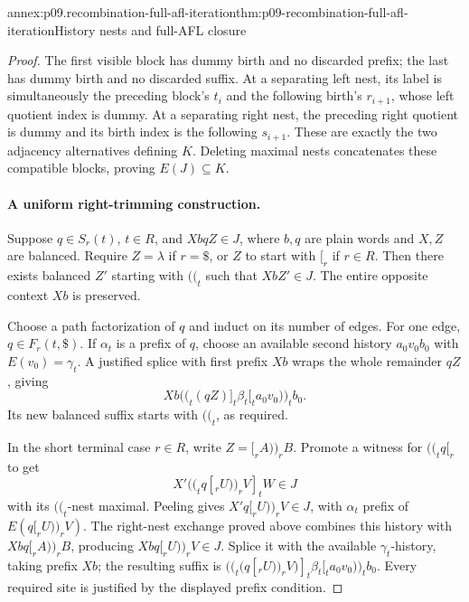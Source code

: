 \begin{annexitem}{annex:p09.recombination-full-afl-iteration}{thm:p09-recombination-full-afl-iteration}{History nests and full-AFL closure}
\begin{proof}
The first visible block has dummy birth and no discarded prefix;
the last has dummy birth and no discarded suffix.
At a separating left nest, its label is simultaneously the preceding
block's \(t_i\) and the following birth's \(r_{i+1}\), whose left
quotient index is dummy. At a separating right nest, the preceding
right quotient is dummy and its birth index is the following \(s_{i+1}\).
These are exactly the two adjacency alternatives defining \(K\).
Deleting maximal nests concatenates these compatible blocks, proving
\(E(J)\subseteq K\).

\paragraph{A uniform right-trimming construction.}
Suppose \(q\in S_r(t)\), \(t\in R\), and
\(XbqZ\in J\), where \(b,q\) are plain words and \(X,Z\) are balanced.
Require \(Z=\lambda\) if \(r=\$\), or \(Z\) to start with \([_r\)
if \(r\in R\). Then there exists balanced \(Z'\) starting with \(\mathopen{(\!(}_t\)
such that \(XbZ'\in J\). The entire opposite context \(Xb\) is preserved.

Choose a path factorization of \(q\) and induct on its number of edges.
For one edge, \(q\in F_r(t,\$)\).
If \(\alpha_t\) is a prefix of \(q\), choose an available second history
\(a_0v_0b_0\) with \(E(v_0)=\gamma_t\).
A justified splice with first prefix \(Xb\) wraps the whole remainder
\(qZ\), giving
\[
 Xb\mathopen{(\!(}_t(qZ)]_t\beta_t[_ta_0v_0\mathclose{)\!)}_tb_0.
\]
Its new balanced suffix starts with \(\mathopen{(\!(}_t\), as required.

In the short terminal case \(r\in R\), write
\(Z=[_rA\mathclose{)\!)}_rB\).
Promote a witness for \(\mathopen{(\!(}_tq[_r\) to get
\[
 X'\mathopen{(\!(}_tq[_rU\mathclose{)\!)}_rV]_tW\in J
\]
with its \(\mathopen{(\!(}_t\)-nest maximal. Peeling gives
\(X'q[_rU\mathclose{)\!)}_rV\in J\), with \(\alpha_t\) prefix of
\(E(q[_rU\mathclose{)\!)}_rV)\).
The right-nest exchange proved above combines this history with
\(Xbq[_rA\mathclose{)\!)}_rB\), producing
\(Xbq[_rU\mathclose{)\!)}_rV\in J\).
Splice it with the available \(\gamma_t\)-history, taking prefix \(Xb\);
the resulting suffix is
\(\mathopen{(\!(}_t(q[_rU\mathclose{)\!)}_rV)]_t\beta_t[_ta_0v_0\mathclose{)\!)}_tb_0\).
Every required site is justified by the displayed prefix condition.


\end{proof}
\end{annexitem}

